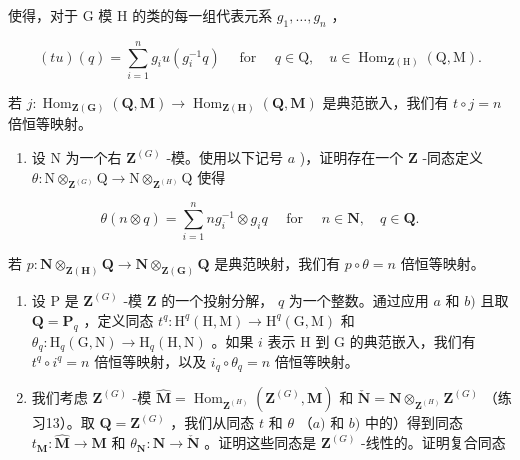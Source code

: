 使得，对于 G 模 H 的类的每一组代表元系 \(g_{1}, \ldots, g_{n}\) ，

\[
(t u) (q) = \sum_ {i = 1} ^ {n} g _ {i} u \left(g _ {i} ^ {- 1} q\right) \quad \text { for } \quad q \in \mathrm{Q}, \quad u \in \operatorname{Hom} _ {\mathbf {Z} (\mathrm{H})} (\mathrm{Q}, \mathrm{M}).
\]

若 \(j: \operatorname{Hom}_{\mathbf{Z}(\mathbf{G})}(\mathbf{Q}, \mathbf{M}) \to \operatorname{Hom}_{\mathbf{Z}(\mathbf{H})}(\mathbf{Q}, \mathbf{M})\) 是典范嵌入，我们有 \(t \circ j = n\) 倍恒等映射。

\begin{enumerate}
\def\labelenumi{\alph{enumi})}
\setcounter{enumi}{1}
\tightlist
\item
  设 N 为一个右 \(\mathbf{Z}^{(G)}\) -模。使用以下记号 \(a\) )，证明存在一个 \(\mathbf{Z}\) -同态定义 \(\theta: \mathrm{N} \otimes_{\mathbf{Z}^{(G)}} \mathrm{Q} \to \mathrm{N} \otimes_{\mathbf{Z}^{(H)}} \mathrm{Q}\) 使得
\end{enumerate}

\[
\theta (n \otimes q) = \sum_ {i = 1} ^ {n} n g _ {i} ^ {- 1} \otimes g _ {i} q \quad \text { for } \quad n \in \mathbf {N}, \quad q \in \mathbf {Q}.
\]

若 \(p: \mathbf{N} \otimes_{\mathbf{Z}(\mathbf{H})} \mathbf{Q} \to \mathbf{N} \otimes_{\mathbf{Z}(\mathbf{G})} \mathbf{Q}\) 是典范映射，我们有 \(p \circ \theta = n\) 倍恒等映射。
\begin{enumerate}
\def\labelenumi{\alph{enumi})}
\setcounter{enumi}{2}
\item
  设 P 是 \(\mathbf{Z}^{(G)}\) -模 \(\mathbf{Z}\) 的一个投射分解， \(q\) 为一个整数。通过应用 \(a\) 和 \(b)\) 且取 \(\mathbf{Q} = \mathbf{P}_q\) ，定义同态 \(t^q: \mathrm{H}^q(\mathrm{H}, \mathrm{M}) \to \mathrm{H}^q(\mathrm{G}, \mathrm{M})\) 和 \(\theta_q: \mathrm{H}_q(\mathrm{G}, \mathrm{N}) \to \mathrm{H}_q(\mathrm{H}, \mathrm{N})\) 。如果 \(i\) 表示 H 到 G 的典范嵌入，我们有 \(t^q \circ i^q = n\) 倍恒等映射，以及 \(i_q \circ \theta_q = n\) 倍恒等映射。
\item
  我们考虑 \(\mathbf{Z}^{(G)}\) -模 \(\hat{\mathbf{M}} = \operatorname{Hom}_{\mathbf{Z}^{(H)}} (\mathbf{Z}^{(G)}, \mathbf{M})\) 和 \(\check{\mathbf{N}} = \mathbf{N} \otimes_{\mathbf{Z}^{(H)}} \mathbf{Z}^{(G)}\) （练习13）。取 \(\mathbf{Q} = \mathbf{Z}^{(G)}\) ，我们从同态 \(t\) 和 \(\theta\) （\(a)\) 和 \(b)\) 中的）得到同态 \(t_\mathbf{M}: \hat{\mathbf{M}} \to \mathbf{M}\) 和 \(\theta_\mathbf{N}: \mathbf{N} \to \check{\mathbf{N}}\) 。证明这些同态是 \(\mathbf{Z}^{(G)}\) -线性的。证明复合同态
\end{enumerate}

